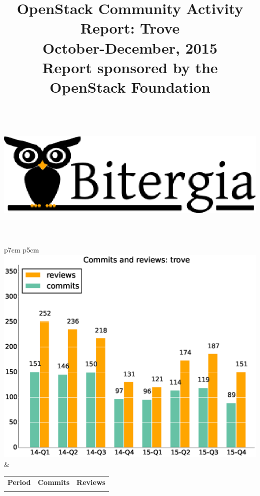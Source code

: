 \documentclass[a4wide,11pt]{article}
\begin{document}
\title{OpenStack Community Activity Report: Trove\\
      October-December, 2015 \\
      Report sponsored by the OpenStack Foundation\\
        ~~\\~~\\  \includegraphics[scale=.35]{logo.eps}       \\}




\maketitle

\newpage



\begin{tabular}{p{7cm} p{5cm}}
    \vspace{0pt} 
    \includegraphics[scale=.35]{figs/commitstrove.eps}
    & 
    \vspace{0pt}
    \begin{tabular}{l|r|r|}%
    \bfseries Period & \bfseries Commits & \bfseries Reviews %
    \csvreader[head to column names]{data/commitstrove.csv}{}%
    {\\ & \commits & \submitted}
    \end{tabular}
\end{tabular}
\end{document}
